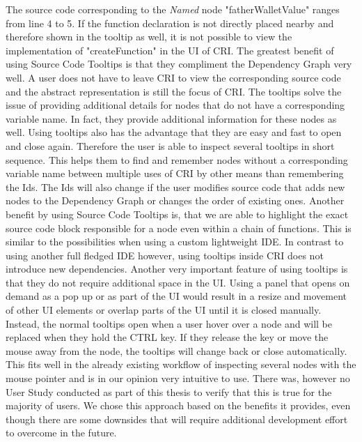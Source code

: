The source code corresponding to the \emph{Named} node "fatherWalletValue" ranges from line 4 to 5. If the function declaration is not directly placed nearby and therefore shown in the tooltip as well, it is not possible to view the implementation of "createFunction" in the UI of CRI.
The greatest benefit of using Source Code Tooltips is that they compliment the Dependency Graph very well. A user does not have to leave CRI to view the corresponding source code and the abstract representation is still the focus of CRI. The tooltips solve the issue of providing additional details for nodes that do not have a corresponding variable name. In fact, they provide additional information for these nodes as well. Using tooltips also has the advantage that they are easy and fast to open and close again. Therefore the user is able to inspect several tooltips in short sequence. This helps them to find and remember nodes without a corresponding variable name between multiple uses of CRI by other means than remembering the Ids.  The Ids will also change if the user modifies source code that adds new nodes to the Dependency Graph or changes the order of existing ones. Another benefit by using Source Code Tooltips is, that we are able to highlight the exact source code block responsible for a node even within a chain of functions. This is similar to the possibilities when using a  custom lightweight IDE. In contrast to using another full fledged IDE however, using tooltips inside CRI does not introduce new dependencies. Another very important feature of using tooltips is that they do not require additional space in the UI. Using a panel that opens on demand as a pop up or as part of the UI would result in a resize and movement of other UI elements or overlap parts of the UI until it is closed manually. Instead, the normal tooltips open when a user hover over a node and will be replaced when they hold the CTRL key. If they release the key or move the mouse away from the node, the tooltips will change back or close automatically. This fits well in the already existing workflow of inspecting several nodes with the mouse pointer and is in our opinion very intuitive to use. There was, however no User Study conducted as part of this thesis to verify that this is true for the majority of users. We chose this approach based on the benefits it provides, even though there are some downsides that will require additional development effort to overcome in the future.
			
